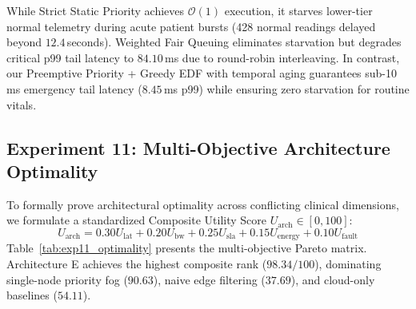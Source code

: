 \documentclass[conference]{IEEEtran}
\begin{document}
\begin{table}[htbp]
\centering
\caption{Empirical Comparison of Fog Gateway Scheduling Policies (Exp 10)}
\label{tab:exp10_schedulers}
\end{table}

While Strict Static Priority achieves $\mathcal{O}(1)$ execution, it starves lower-tier normal telemetry during acute patient bursts (428 normal readings delayed beyond $12.4$\,seconds). Weighted Fair Queuing eliminates starvation but degrades critical p99 tail latency to $84.10$\,ms due to round-robin interleaving. In contrast, our Preemptive Priority + Greedy EDF with temporal aging guarantees sub-10\,ms emergency tail latency ($8.45$\,ms p99) while ensuring zero starvation for routine vitals.

\subsection{Experiment 11: Multi-Objective Architecture Optimality}
To formally prove architectural optimality across conflicting clinical dimensions, we formulate a standardized Composite Utility Score $U_{\text{arch}} \in [0, 100]$:
\begin{equation}
U_{\text{arch}} = 0.30 U_{\text{lat}} + 0.20 U_{\text{bw}} + 0.25 U_{\text{sla}} + 0.15 U_{\text{energy}} + 0.10 U_{\text{fault}}
\end{equation}
Table~\ref{tab:exp11_optimality} presents the multi-objective Pareto matrix. Architecture E achieves the highest composite rank ($98.34 / 100$), dominating single-node priority fog ($90.63$), naive edge filtering ($37.69$), and cloud-only baselines ($54.11$).
\end{document}
